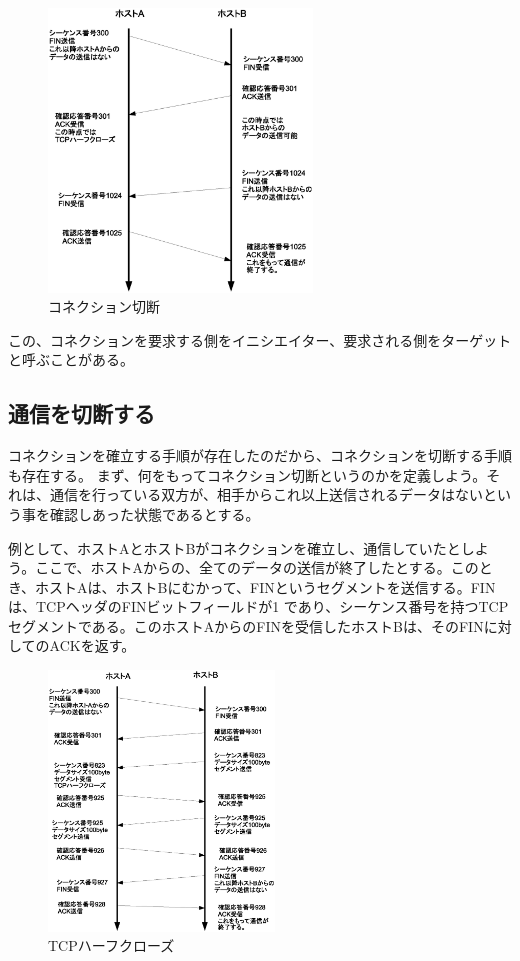 \begin{figure}
	\includegraphics[width=7cm, clip]{draw/tcp05n.eps}
	\caption{コネクション切断}
	\label{fig:tcp05}
\end{figure}

この、コネクションを要求する側をイニシエイター、要求される側をターゲットと呼ぶことがある。

\subsection{通信を切断する}
コネクションを確立する手順が存在したのだから、コネクションを切断する手順も存在する。
まず、何をもってコネクション切断というのかを定義しよう。それは、通信を行っている双方が、相手からこれ以上送信されるデータはないという事を確認しあった状態であるとする。



例として、ホストAとホストBがコネクションを確立し、通信していたとしよう。ここで、ホストAからの、全てのデータの送信が終了したとする。このとき、ホストAは、ホストBにむかって、FINというセグメントを送信する。FINは、TCPヘッダのFINビットフィールドが1 であり、シーケンス番号を持つTCPセグメントである。このホストAからのFINを受信したホストBは、そのFINに対してのACKを返す。

\begin{figure}
	\includegraphics[width=6cm, clip]{draw/tcp06n.eps}
	\caption{TCPハーフクローズ}
	\label{fig:tcp06}
\end{figure}


